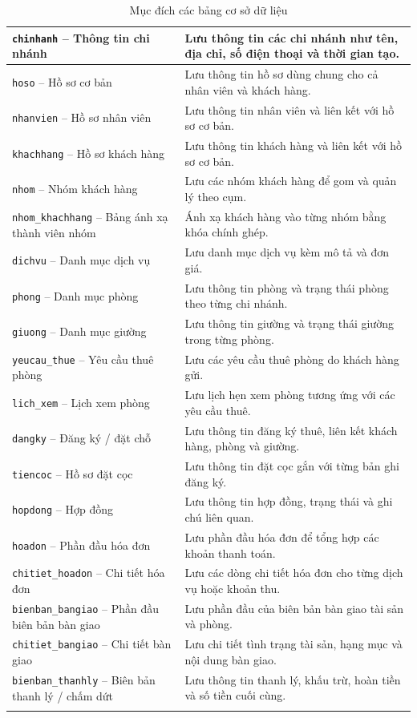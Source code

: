 \begin{longtable}{|p{5.0cm}|p{10.0cm}|}
\texttt{chinhanh} -- Thông tin chi nhánh & Lưu thông tin các chi nhánh như tên, địa chỉ, số điện thoại và thời gian tạo. \\
\hline
\texttt{hoso} -- Hồ sơ cơ bản & Lưu thông tin hồ sơ dùng chung cho cả nhân viên và khách hàng. \\
\hline
\texttt{nhanvien} -- Hồ sơ nhân viên & Lưu thông tin nhân viên và liên kết với hồ sơ cơ bản. \\
\hline
\texttt{khachhang} -- Hồ sơ khách hàng & Lưu thông tin khách hàng và liên kết với hồ sơ cơ bản. \\
\hline
\texttt{nhom} -- Nhóm khách hàng & Lưu các nhóm khách hàng để gom và quản lý theo cụm. \\
\hline
\texttt{nhom\_khachhang} -- Bảng ánh xạ thành viên nhóm & Ánh xạ khách hàng vào từng nhóm bằng khóa chính ghép. \\
\hline
\texttt{dichvu} -- Danh mục dịch vụ & Lưu danh mục dịch vụ kèm mô tả và đơn giá. \\
\hline
\texttt{phong} -- Danh mục phòng & Lưu thông tin phòng và trạng thái phòng theo từng chi nhánh. \\
\hline
\texttt{giuong} -- Danh mục giường & Lưu thông tin giường và trạng thái giường trong từng phòng. \\
\hline
\texttt{yeucau\_thue} -- Yêu cầu thuê phòng & Lưu các yêu cầu thuê phòng do khách hàng gửi. \\
\hline
\texttt{lich\_xem} -- Lịch xem phòng & Lưu lịch hẹn xem phòng tương ứng với các yêu cầu thuê. \\
\hline
\texttt{dangky} -- Đăng ký / đặt chỗ & Lưu thông tin đăng ký thuê, liên kết khách hàng, phòng và giường. \\
\hline
\texttt{tiencoc} -- Hồ sơ đặt cọc & Lưu thông tin đặt cọc gắn với từng bản ghi đăng ký. \\
\hline
\texttt{hopdong} -- Hợp đồng & Lưu thông tin hợp đồng, trạng thái và ghi chú liên quan. \\
\hline
\texttt{hoadon} -- Phần đầu hóa đơn & Lưu phần đầu hóa đơn để tổng hợp các khoản thanh toán. \\
\hline
\texttt{chitiet\_hoadon} -- Chi tiết hóa đơn & Lưu các dòng chi tiết hóa đơn cho từng dịch vụ hoặc khoản thu. \\
\hline
\texttt{bienban\_bangiao} -- Phần đầu biên bản bàn giao & Lưu phần đầu của biên bản bàn giao tài sản và phòng. \\
\hline
\texttt{chitiet\_bangiao} -- Chi tiết bàn giao & Lưu chi tiết tình trạng tài sản, hạng mục và nội dung bàn giao. \\
\hline
\texttt{bienban\_thanhly} -- Biên bản thanh lý / chấm dứt & Lưu thông tin thanh lý, khấu trừ, hoàn tiền và số tiền cuối cùng. \\
\hline
\caption{Mục đích các bảng cơ sở dữ liệu}\label{tab:scriptdb06-table-purpose}
\end{longtable}
\endgroup


